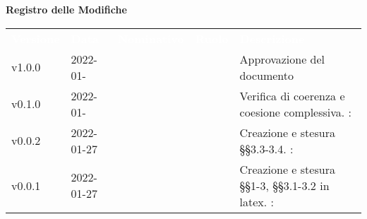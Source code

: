 

{\LARGE{\textbf{Registro delle Modifiche}}} \\
\begin{table}[!htbp]
\renewcommand{\arraystretch}{1.5}
\begin{tabular}{ m{}<{\centering}  m{}<{\centering}  m{}<{\centering}  m{}<{\centering}  m{}<{\centering} }
	\rowcolor{darkblue}
	\textcolor{white}{\textbf{Versione}} &\textcolor{white}{\textbf{Data}}& \textcolor{white}{\textbf{Nominativo}} & \textcolor{white}{\textbf{Ruolo}}&\textcolor{white}{\textbf{Descrizione}}\\ 

	v1.0.0 & 2022-01- & \ & \RE & Approvazione del documento \\

	\rowcolor{gray!25}v0.1.0& 2022-01- & \FP & \AN & Verifica di coerenza e coesione complessiva. \VE: \textit{}\\

	v0.0.2& 2022-01-27& \FP &\AN & Creazione e stesura \S\S{}3.3-3.4. \VE: \textit{}\\

	v0.0.1& 2022-01-27& \GC &\AN & Creazione e stesura \S\S{}1-3, \S\S{}3.1-3.2 in latex. \VE: \textit{}\\

\end{tabular}
\end{table}

\pagebreak